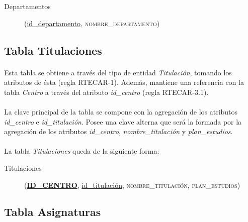       \begin{description}
         \item[Departamentos] \begin{flushleft}(\underline{id\_departamento},
         \textsc{nombre\_departamento})\end{flushleft}
      \end{description}

   \subsection{Tabla Titulaciones}

      \paragraph{}Esta tabla se obtiene a través del tipo de entidad
      \textit{Titulación}, tomando los atributos de ésta (regla RTECAR-1).
      Además, mantiene una referencia con la tabla \textit{Centro} a través
      del atributo \textit{id\_centro} (regla RTECAR-3.1).

      \paragraph{}La clave principal de la tabla se compone con la agregación de
      los atributos \textit{id\_centro} e \textit{id\_titulación}. Posee una
      clave alterna que será la formada por la agregación de los atributos
      \textit{id\_centro}, \textit{nombre\_titulación} y
      \textit{plan\_estudios}.

      \paragraph{}La tabla \textit{Titulaciones} queda de la siguiente forma:

      \begin{description}
         \item[Titulaciones] \begin{flushleft}(\underline{\textbf{ID\_CENTRO}},
         \underline{id\_titulación}, \textsc{nombre\_titulación},
         \textsc{plan\_estudios})\end{flushleft}
      \end{description}

   \subsection{Tabla Asignaturas}

